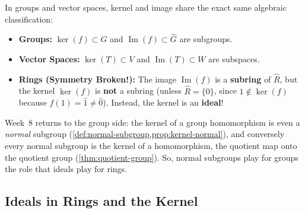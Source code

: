 \begin{content}

\begin{steps}
In groups and vector spaces, kernel and image share the exact same algebraic classification:
\begin{itemize}
    \item \textbf{Groups:} $\operatorname{ker}(f) \subset G$ and $\operatorname{Im}(f) \subset \hat{G}$ are subgroups.
    \item \textbf{Vector Spaces:} $\ker(T) \subset V$ and $\operatorname{Im}(T) \subset W$ are subspaces.
    \item \textbf{Rings (Symmetry Broken!):} The image $\operatorname{Im}(f)$ is a \textbf{subring} of $\hat{R}$, but the kernel $\operatorname{ker}(f)$ is \textbf{not} a subring (unless $\hat{R} = \{0\}$, since $1 \notin \operatorname{ker}(f)$ because $f(1) = \hat{1} \neq \hat{0}$). Instead, the kernel is an \textbf{ideal}!
\end{itemize}
Week~8 returns to the group side: the kernel of a group homomorphism is even a \emph{normal} subgroup (\cref{def:normal-subgroup,prop:kernel-normal}), and conversely every normal subgroup is the kernel of a homomorphism, the quotient map onto the quotient group (\cref{thm:quotient-group}). So, normal subgroups play for groups the role that ideals play for rings.
\end{steps}
\end{content}

\subsection{Ideals in Rings and the Kernel}


